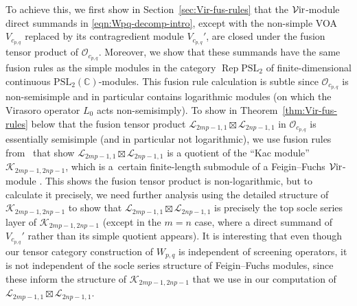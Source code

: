 \documentclass[pdftex]{sigma}
\numberwithin{equation}{section}
\theoremstyle{definition}
\begin{document}
To achieve this, we first show in Section~\ref{sec:Vir-fus-rules} that the $\mathcal{V}{\rm ir}$-module direct summands in \eqref{eqn:Wpq-decomp-intro}, except with the non-simple VOA $V_{c_{p,q}}$ replaced by its contragredient module $V_{c_{p,q}}'$, are closed under the fusion tensor product of $\mathcal{O}_{c_{p,q}}$. Moreover, we show that these summands have the same fusion rules as the simple modules in the category $\operatorname{Rep} \mathrm{PSL}_2$ of finite-dimensional continuous $\mathrm{PSL}_2(\mathbb{C})$-modules.
This fusion rule calculation is subtle since $\mathcal{O}_{c_{p,q}}$ is non-semisimple and in particular contains logarithmic modules (on which the Virasoro operator $L_0$ acts non-semisimply). To show in Theorem~\ref{thm:Vir-fus-rules} below that the fusion tensor product $\mathcal{L}_{2mp-1,1}\boxtimes\mathcal{L}_{2np-1,1}$ in $\mathcal{O}_{c_{p,q}}$ is essentially semisimple (and in particular not logarithmic), we use fusion rules from~\cite{MS-cpq-Vir} that show $\mathcal{L}_{2mp-1,1}\boxtimes\mathcal{L}_{2np-1,1}$ is a quotient of the ``Kac module'' $\mathcal{K}_{2mp-1,2np-1}$, which is a~certain finite-length submodule of a Feigin--Fuchs $\mathcal{V}{\rm ir}$-module \cite{MDRR}. This shows the fusion tensor product is non-logarithmic, but to calculate it precisely, we need further analysis using the detailed structure of $\mathcal{K}_{2mp-1,2np-1}$ to show that $\mathcal{L}_{2mp-1,1}\boxtimes\mathcal{L}_{2np-1,1}$ is precisely the top socle series layer of $\mathcal{K}_{2mp-1,2np-1}$ (except in the $m=n$ case, where a direct summand of $V_{c_{p,q}}'$ rather than its simple quotient appears). It is interesting that even though our tensor category construction of $W_{p,q}$ is independent of screening operators, it is not independent of the socle series structure of Feigin--Fuchs modules, since these inform the structure of $\mathcal{K}_{2mp-1,2np-1}$ that we use in our computation of $\mathcal{L}_{2mp-1,1}\boxtimes\mathcal{L}_{2np-1,1}$.
\end{document}
